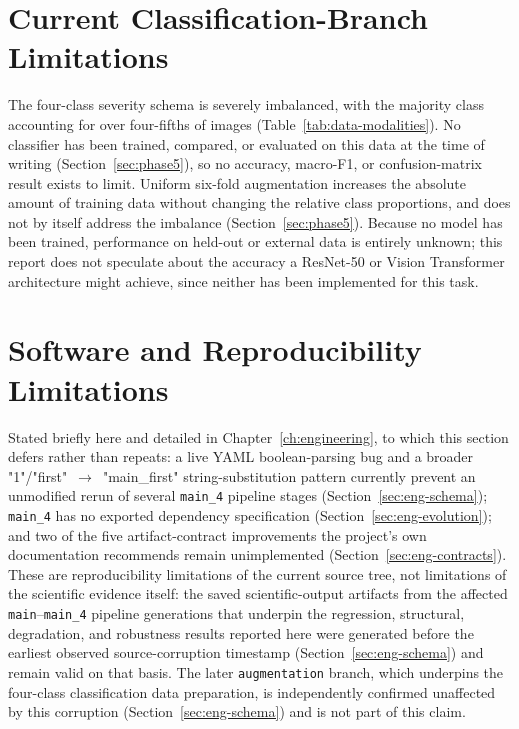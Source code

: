 \section{Current Classification-Branch Limitations}
\label{sec:lim-classification}

The four-class severity schema is severely imbalanced, with the majority
class accounting for over four-fifths of images
(Table~\ref{tab:data-modalities}). No classifier has been trained,
compared, or evaluated on this data at the time of writing
(Section~\ref{sec:phase5}), so no accuracy, macro-F1, or confusion-matrix
result exists to limit. Uniform six-fold augmentation increases the
absolute amount of training data without changing the relative class
proportions, and does not by itself address the imbalance
(Section~\ref{sec:phase5}). Because no model has been trained, performance
on held-out or external data is entirely unknown; this report does not
speculate about the accuracy a ResNet-50 or Vision Transformer
architecture might achieve, since neither has been implemented for this
task.

\section{Software and Reproducibility Limitations}
\label{sec:lim-software}

Stated briefly here and detailed in Chapter~\ref{ch:engineering}, to which
this section defers rather than repeats: a live YAML boolean-parsing bug
and a broader "1"/"first"~$\rightarrow$~"main\_first" string-substitution
pattern currently prevent an unmodified rerun of several \texttt{main\_4}
pipeline stages (Section~\ref{sec:eng-schema}); \texttt{main\_4} has no
exported dependency specification (Section~\ref{sec:eng-evolution}); and
two of the five artifact-contract improvements the project's own
documentation recommends remain unimplemented
(Section~\ref{sec:eng-contracts}). These are reproducibility limitations
of the current source tree, not limitations of the scientific evidence
itself: the saved scientific-output artifacts from the affected
\texttt{main}--\texttt{main\_4} pipeline generations that underpin the
regression, structural, degradation, and robustness results reported here
were generated before the earliest observed source-corruption timestamp
(Section~\ref{sec:eng-schema}) and remain valid on that basis. The later
\texttt{augmentation} branch, which underpins the four-class
classification data preparation, is independently confirmed unaffected by
this corruption (Section~\ref{sec:eng-schema}) and is not part of this
claim.
